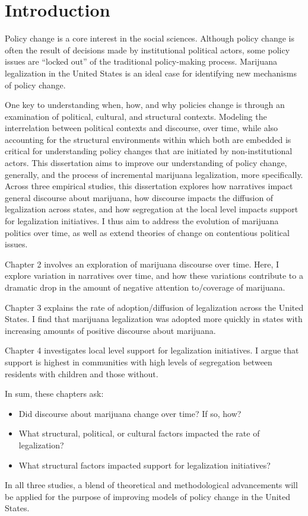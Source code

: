 \chapter{Introduction}

Policy change is a core interest in the social sciences. Although policy change is often the result of decisions made by institutional political actors, some policy issues are ``locked out'' of the traditional policy-making process. Marijuana legalization in the United States is an ideal case for identifying new mechanisms of policy change. 

One key to understanding when, how, and why policies change is through an examination of political, cultural, and structural contexts. Modeling the interrelation between political contexts and discourse, over time, while also accounting for the structural environments within which both are embedded is critical for understanding policy changes that are initiated by non-institutional actors. This dissertation aims to improve our understanding of policy change, generally, and the process of incremental marijuana legalization, more specifically. Across three empirical studies, this dissertation explores how narratives impact general discourse about marijuana, how discourse impacts the diffusion of legalization across states, and how segregation at the local level impacts support for legalization initiatives. I thus aim to address the evolution of marijuana politics over time, as well as extend theories of change on contentious political issues. 


Chapter 2 involves an exploration of marijuana discourse over time. Here, I explore variation in narratives over time, and how these variations contribute to a dramatic drop in the amount of negative attention to/coverage of marijuana. 

Chapter 3 explains the rate of adoption/diffusion of legalization across the United States. I find that marijuana legalization was adopted more quickly in states with increasing amounts of positive discourse about marijuana. 

Chapter 4 investigates local level support for legalization initiatives. I argue that support is highest in communities with high levels of segregation between residents with children and those without. 


In sum, these chapters ask:

\begin{itemize}
\item Did discourse about marijuana change over time? If so, how?
\item What structural, political, or cultural factors impacted the rate of legalization?
\item What structural factors impacted support for legalization initiatives?
\end{itemize}

In all three studies, a blend of theoretical and methodological advancements will be applied for the purpose of improving models of policy change in the United States.
